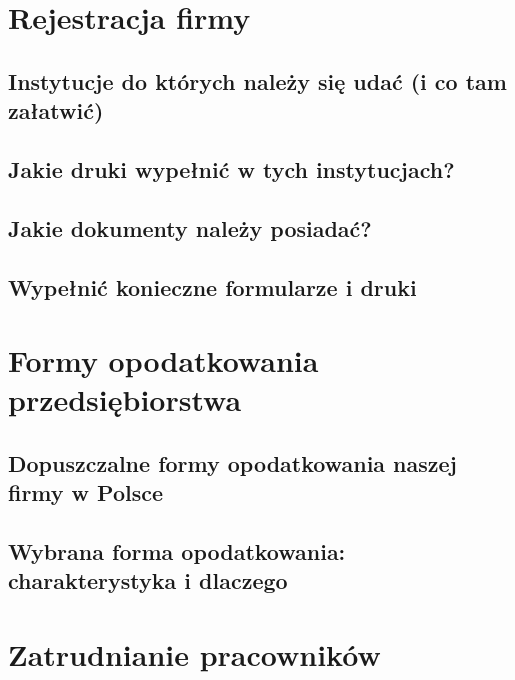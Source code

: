 \documentclass{sprawozdanie-agh}
\begin{document}
	\section{Rejestracja firmy}

		\subsection{Instytucje do których należy się udać (i co tam załatwić)}
		\subsection{Jakie druki wypełnić w tych instytucjach?}
		\subsection{Jakie dokumenty należy posiadać?}
		\subsection{Wypełnić konieczne formularze i druki}

	\section{Formy opodatkowania przedsiębiorstwa}

		\subsection{Dopuszczalne formy opodatkowania naszej firmy w Polsce}
		\subsection{Wybrana forma opodatkowania: charakterystyka i dlaczego}

	\section{Zatrudnianie pracowników}
\end{document}

